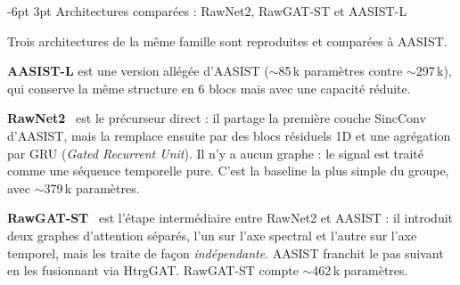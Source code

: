 \documentclass[10pt, a4paper]{article}
\makeatletter
\renewcommand{\subsection}{\@startsection{subsection}{2}{\z@}%
  {-6pt \@plus -2pt \@minus -1pt}{3pt \@plus 1pt}%
  {\normalfont\large\bfseries}}
\makeatother
\begin{document}
\subsection{Architectures comparées : RawNet2, RawGAT-ST et AASIST-L}

Trois architectures de la même famille sont reproduites et comparées à AASIST.

\textbf{AASIST-L} est une version allégée d'AASIST ($\sim$85\,k paramètres contre $\sim$297\,k), qui conserve la même structure en 6 blocs mais avec une capacité réduite.

\textbf{RawNet2}~\cite{tak2021} est le précurseur direct : il partage la première couche SincConv d'AASIST, mais la remplace ensuite par des blocs résiduels 1D et une agrégation par GRU (\textit{Gated Recurrent Unit}). Il n'y a aucun graphe : le signal est traité comme une séquence temporelle pure. C'est la baseline la plus simple du groupe, avec $\sim$379\,k paramètres.

\textbf{RawGAT-ST}~\cite{jung2021rawgat} est l'étape intermédiaire entre RawNet2 et AASIST : il introduit deux graphes d'attention séparés, l'un sur l'axe spectral et l'autre sur l'axe temporel, mais les traite de façon \textit{indépendante}. AASIST franchit le pas suivant en les fusionnant via HtrgGAT. RawGAT-ST compte $\sim$462\,k paramètres.
\end{document}
